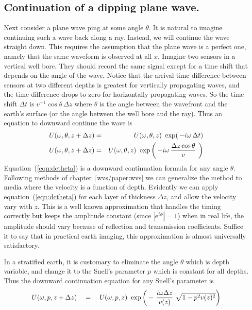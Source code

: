 \subsection{Continuation of a dipping plane wave.}
Next consider a plane wave ping at some angle $\theta$.
It is natural to imagine continuing such a wave back along a ray.
Instead, we will continue the wave straight down.
This requires the assumption that the plane wave is a perfect one,
namely that the same waveform is observed at all $x$.
Imagine two sensors in a vertical well bore.
They should record the same signal except for
a time shift that depends on the angle of the wave.
Notice that the arrival time difference between sensors
at two different depths is greatest for vertically propagating waves,
and the time difference drops to zero for horizontally propagating waves.
So the time shift $\Delta t$ is $v^{-1} \cos\theta\,\Delta z$
where $\theta$ is the angle between the wavefront and the earth's surface
(or the angle between the well bore and the ray).
Thus an equation to downward continue the wave is
\begin{eqnarray}
U( \omega , \theta ,z+\Delta z)
 &=&
U( \omega , \theta ,z) \ 
 \exp ( \,  -i \omega \, \Delta t)
                                                        \\
U( \omega , \theta ,z+\Delta z)
 &=&
U( \omega , \theta ,z) \ 
 \exp \left(
         \,  -i \omega \,
         {\Delta z \cos\theta \over v}\  
\right)
\label{eqn:dctheta}
\end{eqnarray}
Equation~(\ref{eqn:dctheta})
is a downward continuation formula for any angle $\theta$.
Following methods of chapter~\ref{wvs/paper:wvs} we can generalize
the method to media where the velocity is a function of depth.
Evidently we can apply equation~(\ref{eqn:dctheta})
for each layer of thickness $\Delta z$,
and allow the velocity vary with $z$.
This is a well known approximation that handles the timing correctly
but keeps the amplitude constant (since $|e^{i\phi}|=1$)
when in real life,
the amplitude should vary
because of reflection and transmission coefficients.
Suffice it to say that in practical earth imaging,
this approximation is almost universally satisfactory.
\par
In a stratified earth,
it is customary to eliminate the angle $\theta$ which is depth variable,
and change it to the Snell's parameter $p$ which is constant for all depths.
Thus the downward continuation equation for any Snell's parameter is
\begin{equation}
U( \omega , p,z+\Delta z)
 \eq
U( \omega , p,z) \ 
 \exp \left( \,  -\  {i \omega \Delta z \over v(z) } \
\sqrt{1-p^2v(z)^2}  \right)
\label{eqn:dcp}
\end{equation}
